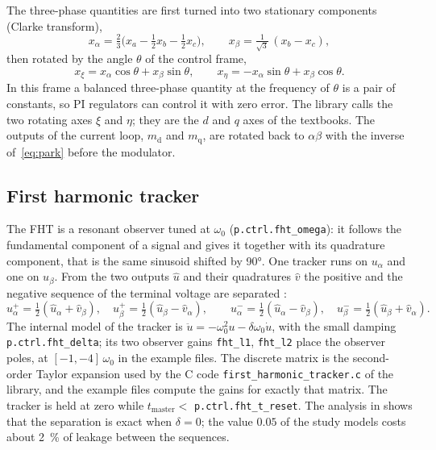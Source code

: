 \documentclass[11pt,a4paper]{scrartcl}
\newcommand{\ped}[1]{_{\mathrm{#1}}}
\newcommand{\code}[1]{\texttt{#1}}
\begin{document}
\begin{onehalfspace}
The three-phase quantities are first turned into two stationary components (Clarke transform),
\begin{equation}
	x_\alpha = \tfrac{2}{3}\big(x_a - \tfrac{1}{2} x_b - \tfrac{1}{2} x_c\big), \qquad
	x_\beta = \tfrac{1}{\sqrt{3}}\,(x_b - x_c),
	\label{eq:clarke}
\end{equation}
then rotated by the angle $\theta$ of the control frame,
\begin{equation}
	x_\xi = x_\alpha \cos\theta + x_\beta \sin\theta, \qquad
	x_\eta = -x_\alpha \sin\theta + x_\beta \cos\theta .
	\label{eq:park}
\end{equation}
In this frame a balanced three-phase quantity at the frequency of $\theta$ is a pair of constants, so PI regulators can control it with zero error. The library calls the two rotating axes $\xi$ and $\eta$; they are the $d$ and $q$ axes of the textbooks. The outputs of the current loop, $m\ped{d}$ and $m\ped{q}$, are rotated back to $\alpha\beta$ with the inverse of~\eqref{eq:park} before the modulator.

\subsection{First harmonic tracker}
\label{sec:fht}

The FHT is a resonant observer tuned at $\omega\ped{0}$ (\code{p.ctrl.fht\_omega}): it follows the fundamental component of a signal and gives it together with its quadrature component, that is the same sinusoid shifted by \ang{90}. One tracker runs on $u_\alpha$ and one on $u_\beta$. From the two outputs $\hat{u}$ and their quadratures $\hat{v}$ the positive and the negative sequence of the terminal voltage are separated \cite{rodriguez2006}:
\begin{equation}
	u^{+}_\alpha = \tfrac{1}{2}(\hat{u}_\alpha + \hat{v}_\beta), \quad
	u^{+}_\beta  = \tfrac{1}{2}(\hat{u}_\beta - \hat{v}_\alpha), \qquad
	u^{-}_\alpha = \tfrac{1}{2}(\hat{u}_\alpha - \hat{v}_\beta), \quad
	u^{-}_\beta  = \tfrac{1}{2}(\hat{u}_\beta + \hat{v}_\alpha).
	\label{eq:sequences}
\end{equation}
The internal model of the tracker is $\ddot{u} = -\omega\ped{0}^2 u - \delta \omega\ped{0} \dot{u}$, with the small damping \code{p.ctrl.fht\_delta}; its two observer gains \code{fht\_l1}, \code{fht\_l2} place the observer poles, at $[-1, -4]\,\omega\ped{0}$ in the example files. The discrete matrix is the second-order Taylor expansion used by the C code \code{first\_harmonic\_tracker.c} of the library, and the example files compute the gains for exactly that matrix. The tracker is held at zero while $t\ped{master} <$ \code{p.ctrl.fht\_t\_reset}. The analysis in \cite{gfm_note} shows that the separation is exact when $\delta = 0$; the value $0.05$ of the study models costs about \SI{2}{\percent} of leakage between the sequences.


\end{onehalfspace}
\end{document}
